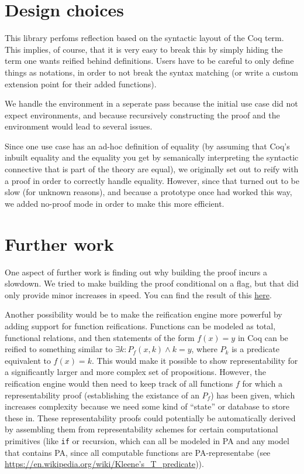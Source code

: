 \documentclass[11pt,a4paper]{article}
\newcommand{\link}[1]{\href{#1}{#1}}
\begin{document}
\section{Design choices}
This library perfoms reflection based on the syntactic layout of the Coq term. This implies, of course, that it is very easy to break this by simply hiding the term one wants reified behind definitions. Users have to be careful to only define things as notations, in order to not break the syntax matching (or write a custom extension point for their added functions).

We handle the environment in a seperate pass because the initial use case did not expect environments, and because recursively constructing the proof and the environment would lead to several issues.

Since one use case has an ad-hoc definition of equality (by assuming that Coq's inbuilt equality and the equality you get by semanically interpreting the syntactic connective that is part of the theory are equal), we originally set out to reify with a proof in order to correctly handle equality. However, since that turned out to be slow (for unknown reasons), and because a prototype once had worked this way, we added no-proof mode in order to make this more efficient.
\section{Further work}
One aspect of further work is finding out why building the proof incurs a slowdown. We tried to make building the proof conditional on a flag, but that did only provide minor increases in speed. You can find the result of this \href{https://github.com/JoJoDeveloping/ACP/tree/mergeNP}{here}.

Another possibility would be to make the reification engine more powerful by adding support for function reifications. Functions can be modeled as total, functional relations, and then statements of the form $f(x)=y$ in Coq can be reified to something similar to $\exists k : P_f(x,k) \wedge k=y$, where $P_k$ is a predicate equivalent to $f(x)=k$. This would make it possible to show representability for a significantly larger and more complex set of propositions. However, the reification engine would then need to keep track of all functions $f$ for which a representability proof (establishing the existance of an $P_f$) has been given, which increases complexity because we need some kind of \enquote{state} or database to store these in. These representability proofs could potentially be automatically derived by assembling them from representability schemes for certain computational primitives (like \lstinline|if| or recursion, which can all be modeled in PA and any model that contains PA, since all computable functions are PA-representabe (see \link{https://en.wikipedia.org/wiki/Kleene's\_T\_predicate})).
\end{document}
